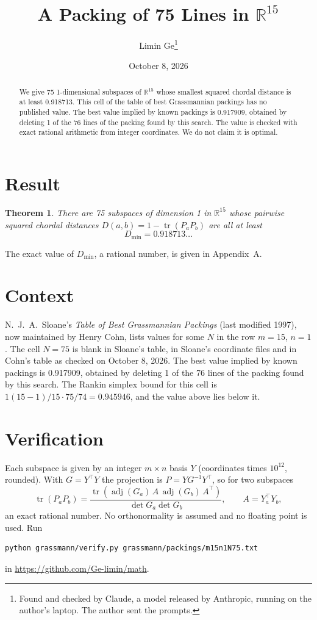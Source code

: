 \documentclass[11pt,a4paper]{article}
\title{A Packing of 75 Lines in $\mathbb{R}^{15}$}
\author{Limin Ge\thanks{Found and checked by Claude, a model released by Anthropic, running on the author's laptop. The author sent the prompts.}}
\date{October 8, 2026}
\newtheorem*{theorem}{Theorem}
\begin{document}
\maketitle
\begin{abstract}
We give 75 1-dimensional subspaces of $\mathbb{R}^{15}$ whose smallest squared chordal distance is at least 0.918713. This cell of the table of best Grassmannian packings has no published value. The best value implied by known packings is 0.917909, obtained by deleting 1 of the 76 lines of the packing found by this search. The value is checked with exact rational arithmetic from integer coordinates. We do not claim it is optimal.
\end{abstract}

\section{Result}
\begin{theorem}
There are 75 subspaces of dimension 1 in $\mathbb{R}^{15}$ whose pairwise squared chordal distances $D(a,b) = 1 - \operatorname{tr}(P_aP_b)$ are all at least
\[ D_{\min} = 0.918713\ldots \]
\end{theorem}
The exact value of $D_{\min}$, a rational number, is given in Appendix~A.


\section{Context}
N.~J.~A.~Sloane's \emph{Table of Best Grassmannian Packings} (last modified 1997), now maintained by Henry Cohn, lists values for some $N$ in the row $m=15$, $n=1$. The cell $N=75$ is blank in Sloane's table, in Sloane's coordinate files and in Cohn's table as checked on October 8, 2026. The best value implied by known packings is 0.917909, obtained by deleting 1 of the 76 lines of the packing found by this search. The Rankin simplex bound for this cell is $1(15-1)/15\cdot 75/74 = 0.945946$, and the value above lies below it.


\section{Verification}
Each subspace is given by an integer $m\times n$ basis $Y$ (coordinates times $10^{12}$, rounded). With $G=Y^\top Y$ the projection is $P=YG^{-1}Y^\top$, so for two subspaces
\[ \operatorname{tr}(P_aP_b)=\frac{\operatorname{tr}(\operatorname{adj}(G_a)\,A\,\operatorname{adj}(G_b)\,A^\top)}{\det G_a\det G_b},\qquad A=Y_a^\top Y_b, \]
an exact rational number. No orthonormality is assumed and no floating point is used. Run
\begin{verbatim}
python grassmann/verify.py grassmann/packings/m15n1N75.txt
\end{verbatim}
in \url{https://github.com/Ge-limin/math}.
\end{document}
